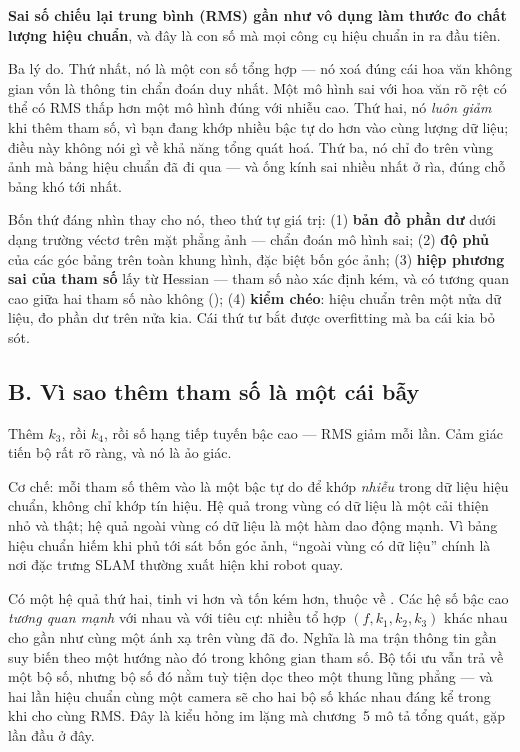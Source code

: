\documentclass[../../vslam.tex]{subfiles}
\begin{document}
\begin{cambay}
\textbf{Sai số chiếu lại trung bình (RMS) gần như vô dụng làm thước đo chất lượng hiệu chuẩn}, và đây là con số mà mọi công cụ hiệu chuẩn in ra đầu tiên.

Ba lý do. Thứ nhất, nó là một con số tổng hợp --- nó xoá đúng cái hoa văn không gian vốn là thông tin chẩn đoán duy nhất. Một mô hình sai với hoa văn rõ rệt có thể có RMS thấp hơn một mô hình đúng với nhiễu cao. Thứ hai, nó \emph{luôn giảm} khi thêm tham số, vì bạn đang khớp nhiều bậc tự do hơn vào cùng lượng dữ liệu; điều này không nói gì về khả năng tổng quát hoá. Thứ ba, nó chỉ đo trên vùng ảnh mà bảng hiệu chuẩn đã đi qua --- và ống kính sai nhiều nhất ở rìa, đúng chỗ bảng khó tới nhất.

Bốn thứ đáng nhìn thay cho nó, theo thứ tự giá trị: (1) \textbf{bản đồ phần dư} dưới dạng trường véctơ trên mặt phẳng ảnh --- chẩn đoán mô hình sai; (2) \textbf{độ phủ} của các góc bảng trên toàn khung hình, đặc biệt bốn góc ảnh; (3) \textbf{hiệp phương sai của tham số} lấy từ Hessian --- tham số nào xác định kém, và có tương quan cao giữa hai tham số nào không (); (4) \textbf{kiểm chéo}: hiệu chuẩn trên một nửa dữ liệu, đo phần dư trên nửa kia. Cái thứ tư bắt được overfitting mà ba cái kia bỏ sót.
\end{cambay}

\subsection{B. Vì sao thêm tham số là một cái bẫy}

Thêm \(k_3\), rồi \(k_4\), rồi số hạng tiếp tuyến bậc cao --- RMS giảm mỗi lần. Cảm giác tiến bộ rất rõ ràng, và nó là ảo giác.

Cơ chế: mỗi tham số thêm vào là một bậc tự do để khớp \emph{nhiễu} trong dữ liệu hiệu chuẩn, không chỉ khớp tín hiệu. Hệ quả trong vùng có dữ liệu là một cải thiện nhỏ và thật; hệ quả ngoài vùng có dữ liệu là một hàm dao động mạnh. Vì bảng hiệu chuẩn hiếm khi phủ tới sát bốn góc ảnh, ``ngoài vùng có dữ liệu'' chính là nơi đặc trưng SLAM thường xuất hiện khi robot quay.

Có một hệ quả thứ hai, tinh vi hơn và tốn kém hơn, thuộc về . Các hệ số bậc cao \emph{tương quan mạnh} với nhau và với tiêu cự: nhiều tổ hợp \((f, k_1, k_2, k_3)\) khác nhau cho gần như cùng một ánh xạ trên vùng đã đo. Nghĩa là ma trận thông tin gần suy biến theo một hướng nào đó trong không gian tham số. Bộ tối ưu vẫn trả về một bộ số, nhưng bộ số đó nằm tuỳ tiện dọc theo một thung lũng phẳng --- và hai lần hiệu chuẩn cùng một camera sẽ cho hai bộ số khác nhau đáng kể trong khi cho cùng RMS. Đây là kiểu hỏng im lặng mà chương~5 mô tả tổng quát, gặp lần đầu ở đây.
\end{document}
